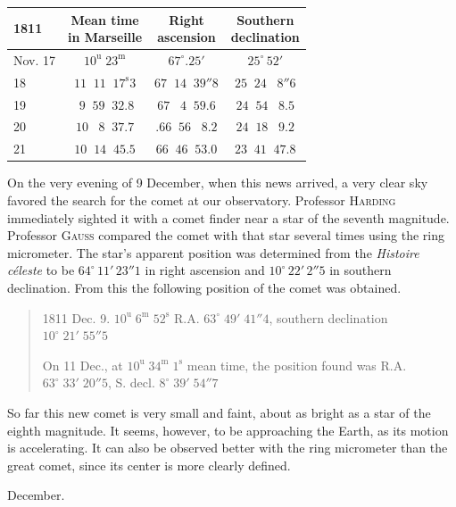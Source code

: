 \begin{center}
\fontsize{10}{12}\selectfont\setlength{\tabcolsep}{3pt}\renewcommand{\arraystretch}{1.15}\begin{tabular}{l|c|c|c}
1811 & \shortstack{Mean time\\in Marseille} & \shortstack{Right\\ascension} & \shortstack{Southern\\declination} \\ \hline
Nov. 17 & $10^{\mathrm u}\;23^{\mathrm m}$ & $67^\circ.25'$ & $25^\circ\,52'$ \\
18 & $11\;\;11\;\;17^{\mathrm s}3$ & $67\;\;14\;\;39''8$ & $25\;\;24\;\;\;8''6$ \\
19 & $\;9\;\;59\;\;32.8$ & $67\;\;\;4\;\;59.6$ & $24\;\;54\;\;\;8.5$ \\
20 & $10\;\;\;8\;\;37.7$ & $.66\;\;56\;\;\;8.2$ & $24\;\;18\;\;\;9.2$ \\
21 & $10\;\;14\;\;45.5$ & $66\;\;46\;\;53.0$ & $23\;\;41\;\;47.8$ \\
\end{tabular}
\end{center}


\par\indent On the very evening of 9 December, when this news arrived, a very clear sky favored the search for the comet at our observatory. Professor \textsc{Harding} immediately sighted it with a comet finder near a star of the seventh magnitude. Professor \textsc{Gauss} compared the comet with that star several times using the ring micrometer. The star’s apparent position was determined from the \emph{Histoire céleste} to be $64^\circ\,11'\,23''1$ in right ascension and $10^\circ\,22'\,2''5$ in southern declination. From this the following position of the comet was obtained.

\begin{quote}\raggedright 1811 Dec. 9. $10^{\mathrm u}\;6^{\mathrm m}\;52^{\mathrm s}$ R.A. $63^\circ\;49'\;41''4$, southern declination $10^\circ\;21'\;55''5$\par\medskip On 11 Dec., at $10^{\mathrm u}\;34^{\mathrm m}\;1^{\mathrm s}$ mean time, the position found was R.A. $63^\circ\;33'\;20''5$, S. decl. $8^\circ\;39'\;54''7$\end{quote}


\par\indent So far this new comet is very small and faint, about as bright as a star of the eighth magnitude. It seems, however, to be approaching the Earth, as its motion is accelerating. It can also be observed better with the ring micrometer than the great comet, since its center is more clearly defined.


\par{} December.


